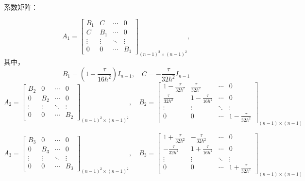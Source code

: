 \documentclass[12pt,a4paper]{article}
\begin{document}
系数矩阵：

\begin{equation}
A_1 = \left[                 
\begin{array}{cccc}
B_1& C &\cdots  & 0\\
C& B_1 &\cdots& 0\\
\vdots  & \vdots & \ddots & \vdots \\
0& 0 &\cdots  &B_1
\end{array}
\right ]_{(n-1)^2 \times (n-1)^2},
\end{equation}
其中，
\begin{equation}
 B_1 =(1+\frac{\tau}{16h^2}) I_{n-1}  ,\quad C = -\frac{\tau}{32h^2} I_{n-1}
\end{equation}
\newpage
\begin{equation}
A_2 = \left[                 
\begin{array}{cccc}
B_2& 0 &\cdots  & 0\\
0& B_2 &\cdots& 0\\
\vdots  & \vdots & \ddots & \vdots \\
0& 0 &\cdots  &B_2
\end{array}
\right ]_{(n-1)^2 \times (n-1)^2},\quad
B_2 = \left[                 
\begin{array}{cccc}
1-\frac{\tau}{32h^2}& \frac{\tau}{32h^2} &\cdots  & 0\\
\frac{\tau}{32h^2}& 1-\frac{\tau}{16h^2} &\cdots& 0\\
\vdots  & \vdots & \ddots & \vdots \\
0& 0 &\cdots  &1-\frac{\tau}{32h^2}
\end{array}
\right ]_{(n-1) \times (n-1)}
\end{equation}

\begin{equation}
A_3 = \left[                 
\begin{array}{cccc}
B_3& 0 &\cdots  & 0\\
0& B_3 &\cdots& 0\\
\vdots  & \vdots & \ddots & \vdots \\
0& 0 &\cdots  &B_3
\end{array}
\right ]_{(n-1)^2 \times (n-1)^2},\quad
B_3 = \left[                 
\begin{array}{cccc}
1+\frac{\tau}{32h^2}& -\frac{\tau}{32h^2} &\cdots  & 0\\
-\frac{\tau}{32h^2}& 1+\frac{\tau}{16h^2} &\cdots& 0\\
\vdots  & \vdots & \ddots & \vdots \\
0& 0 &\cdots  &1+\frac{\tau}{32h^2}
\end{array}
\right ]_{(n-1) \times (n-1)}
\end{equation}
\end{document}

